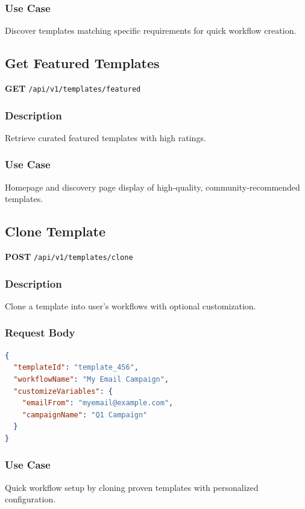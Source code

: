 \documentclass[11pt,a4paper]{report}
\begin{document}
\subsubsection{Use Case}
Discover templates matching specific requirements for quick workflow creation.

\subsection{Get Featured Templates}

\textbf{GET} \texttt{/api/v1/templates/featured}

\subsubsection{Description}
Retrieve curated featured templates with high ratings.

\subsubsection{Use Case}
Homepage and discovery page display of high-quality, community-recommended templates.

\subsection{Clone Template}

\textbf{POST} \texttt{/api/v1/templates/clone}

\subsubsection{Description}
Clone a template into user's workflows with optional customization.

\subsubsection{Request Body}
\begin{lstlisting}[style=jsoncode,language=json]
{
  "templateId": "template_456",
  "workflowName": "My Email Campaign",
  "customizeVariables": {
    "emailFrom": "myemail@example.com",
    "campaignName": "Q1 Campaign"
  }
}
\end{lstlisting}

\subsubsection{Use Case}
Quick workflow setup by cloning proven templates with personalized configuration.
\end{document}
